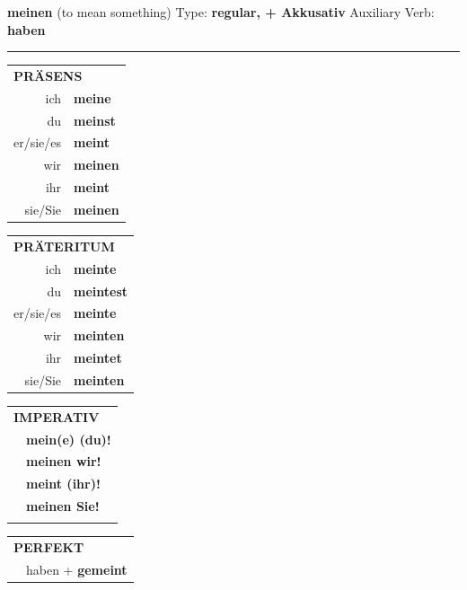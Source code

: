 \documentclass[10pt,a4paper]{revtex4-2}
\begin{document}
\begin{verbbox-acc}
    {\Large \bf meinen} (to mean something) \hfill Type: \textbf{regular, + Akkusativ} \hfill Auxiliary Verb: \textbf{haben} 
    
     \vspace{5pt}

    \hrule
    
    \vspace{5pt}

  \begin{tabular}{rl}
     \multicolumn{2}{l}{\textbf{PRÄSENS} }\\
    ich & \textbf{meine}\\
    du & \textbf{meinst}\\
    er/sie/es & \textbf{meint}\\
    wir & \textbf{meinen}\\
    ihr & \textbf{meint}\\
    sie/Sie & \textbf{meinen}\\
  \end{tabular}
  \hfill
     \begin{tabular}{rl}
    \multicolumn{2}{l}{\textbf{PRÄTERITUM} }\\
    ich & \textbf{meinte}\\
    du & \textbf{meintest}\\
    er/sie/es & \textbf{meinte}\\
    wir & \textbf{meinten}\\
    ihr & \textbf{meintet}\\
    sie/Sie & \textbf{meinten}\\
  \end{tabular}
  \hfill
  \begin{tabular}{rl}
     \multicolumn{2}{l}{\textbf{IMPERATIV} }\\
   & \textbf{mein(e) (du)!}\\
   & \textbf{meinen wir!}\\
   & \textbf{meint (ihr)!}\\
   & \textbf{meinen Sie!}\\
   & \vspace{10pt}
  \end{tabular}

    \vspace{10pt}

 \begin{tabular}{rl}
     \multicolumn{2}{l}{\textbf{PERFEKT}}\\
  &  haben + \textbf{gemeint}\\
  \end{tabular}
\hfill
   \begin{tabular}{rl}
   

\end{tabular}
\end{verbbox-acc}
\end{document}
